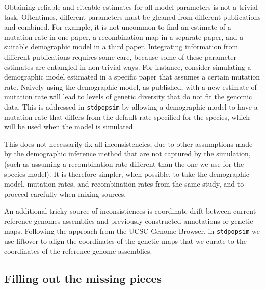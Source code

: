 \documentclass[hidelinks]{article}
\newcommand{\stdpopsim}{\texttt{stdpopsim}\xspace}
\begin{document}

Obtaining reliable and citeable estimates for all model parameters is not a trivial task.
Oftentimes, different parameters must be gleaned from different publications and combined.
For example, it is not uncommon to find an estimate of a mutation rate in one paper,
a recombination map in a separate paper, and a suitable demographic model in a third paper.
Integrating information from different publications requires some care,
because some of these parameter estimates are entangled in non-trivial ways.
For instance, consider simulating a demographic model estimated in a specific paper that assumes
a certain mutation rate.
Naively using the demographic model, as published, with a new estimate of mutation rate
will lead to levels of genetic diversity that do not fit the genomic data.
This is addressed in \stdpopsim by allowing a demographic model to have a mutation rate
that differs from the default rate specified for the species, which will be used when the model is simulated.

This does not necessarily fix all inconsistencies, due to other assumptions made by the demographic
inference method that are not captured by the simulation,
(such as assuming a recombination rate different than the one we use for the species model).
It is therefore simpler, when possible, to take the demographic model, mutation rates,
and recombination rates from the same study,
and to proceed carefully when mixing sources.

An additional tricky source of inconsistiences is coordinate drift between current
reference genomes assemblies and previously constructed annotations or genetic maps.
Following the approach from the UCSC Genome Browser, in \stdpopsim we use liftover to align
the coordinates of the genetic maps that we curate to
the coordinates of the reference genome assemblies.


\subsection*{Filling out the missing pieces}
\end{document}
